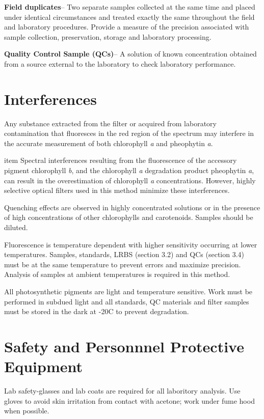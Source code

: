 \documentclass[12pt]{../SOP2}
\begin{document}
\NP \textbf{Field duplicates}-- Two separate samples collected at the same time and placed under identical circumstances and treated exactly the same throughout the field and laboratory procedures. Provide a measure of the precision associated with sample collection, preservation, storage and laboratory processing. 

\NP \textbf{Quality Control Sample (QCs)}-- A solution of known concentration obtained from a source external to the laboratory to check laboratory performance.  


\section{Interferences}
\NP Any substance extracted from the filter or acquired from laboratory contamination that fluoresces in the red region of the spectrum may interfere in the accurate measurement of both chlorophyll \textit{a} and pheophytin \textit{a}.

\NP item Spectral interferences resulting from the fluorescence of the accessory pigment chlorophyll \textit{b}, and the chlorophyll \textit{a} degradation product pheophytin \textit{a}, can result in the overestimation of chlorophyll \textit{a} concentrations. However, highly selective optical filters used in this method minimize these interferences.

\NP Quenching effects are observed in highly concentrated solutions or in the presence of high concentrations of other chlorophylls and carotenoids. Samples should be diluted.

\NP Fluorescence is temperature dependent with higher sensitivity occurring at lower temperatures. Samples, standards, LRBS (section 3.2) and QCs (section 3.4) must be at the same temperature to prevent errors and maximize precision. Analysis of samples at ambient temperatures is required in this method.

\NP All photosynthetic pigments are light and temperature sensitive. Work must be performed in subdued light and all standards, QC materials and filter samples must be stored in the dark at -20\degree C to prevent degradation.


\section{Safety and Personnnel Protective Equipment}

\NP Lab safety-glasses and lab coats are required for all laboritory analysis. Use gloves to avoid skin irritation from contact with acetone; work under fume hood when possible. 
\end{document}
